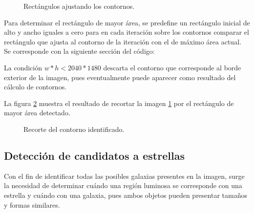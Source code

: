 \documentclass[a4paper,12pt]{article}
\begin{document}
\begin{figure}[!h]
\centering
{}
\caption{Rectángulos ajustando los contornos.}
\label{fig:img3}
\end{figure}
Para determinar el rectángulo de mayor área, se predefine un rectángulo inicial de alto y ancho iguales a cero para en cada iteración sobre los contornos comparar el rectángulo que ajusta al contorno de la iteración con el de máximo área actual. Se corresponde con la siguiente sección del código:

La condición $w*h<2040*1480$ descarta el contorno que corresponde al borde exterior de la imagen, pues eventualmente puede aparecer como resultado del cálculo de contornos.

La figura \ref{fig:img3Rect} muestra el resultado de recortar la imagen \ref{fig:img3} por el rectángulo de mayor área detectado.

\begin{figure}[!h]
\centering
{}
\caption{Recorte del contorno identificado.}
\label{fig:img3Rect}
\end{figure}


\subsection{Detección de candidatos a estrellas}
Con el fin de identificar todas las posibles galaxias presentes en la imagen, surge la necesidad de determinar cuándo una región luminosa se corresponde con una estrella y cuándo con una galaxia, pues ambos objetos pueden presentar tamaños y formas similares.
\end{document}
